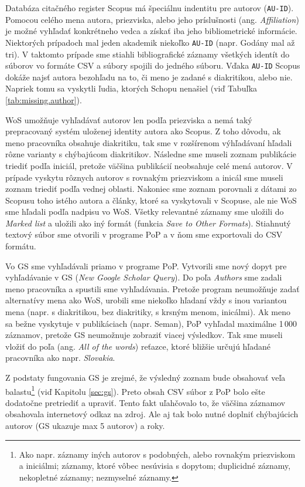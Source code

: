 Databáza citačného register Scopus má špeciálnu indentitu pre autorov
(\texttt{AU-ID}).  Pomocou celého mena autora, priezviska, alebo jeho
príslušnosti (ang.  \emph{Affiliation}) je možné vyhľadať konkrétneho vedca a
získať iba jeho bibliometrické informácie. Niektorých prípadoch mal jeden
akademik niekoľko \texttt{AU-ID} (napr. Godány mal až tri). V taktomto prípade
sme stiahli bibliografické záznamy všetkých identít do súborov vo formáte CSV a
súbory spojili do jedného súboru.  Vďaka  \texttt{AU-ID} Scopus dokáže najsť
autora bezohľadu na to, či meno je zadané s diakritikou, alebo nie.  Napriek
tomu sa vyskytli ľudia, ktorých Schopu nenašiel (viď Tabuľka
\ref{tab:missing.author}).

WoS umožňuje vyhľadávať autorov len podľa priezviska a nemá taký prepracovaný
systém uloženej identity autora ako Scopus. Z toho dôvodu, ak meno pracovníka
obsahuje diakritiku, tak sme v rozšírenom výhľadávaní hľadali rôzne varianty s
chýbajúcom diakritikov. Následne sme museli zoznam publikácie triediť podľa
iniciál, pretože väčšina publikácií neobsahuje celé mená autorov. V prípade
vyskytu rôznych autorov s rovnakým priezviskom a inicál sme museli zoznam
triediť podľa vednej oblasti. Nakoniec sme zoznam porovnali z dátami zo Scopusu
toho istého autora a články, ktoré sa vyskytovali v Scopuse, ale nie WoS sme
hľadali podľa nadpisu vo WoS. Všetky relevantné záznamy sme uložili do
\emph{Marked list} a uložili ako iný formát (funkcia \emph{Save to Other
Formats}). Stiahnutý textový súbor sme otvorili v programe PoP a v ňom sme
exportovali do CSV formátu.

Vo GS sme vyhľadávali priamo v programe PoP. Vytvorili sme nový dopyt pre
vyhľadávanie v GS (\emph{New Google Scholar Query}). Do poľa  \emph{Authors}
sme zadali meno pracovníka a spustili sme vyhľadávania. Pretože program
neumožňuje zadať alternatívy mena ako WoS, urobili sme niekoľko hľadaní vždy s
inou variantou mena (napr. s diakritikou, bez diakritiky, s krsným menom,
inicálmi).  Ak meno sa bežne vyskytuje v publikáciach (napr. Seman), PoP
vyhľadal maximálne 1\,000 záznamov, pretože GS neumožnuje zobraziť viacej
výsledkov. Tak sme museli vložiť do poľa  (ang. \emph{All of
the words}) reťazce, ktoré bližšie určujú hľadané pracovníka ako napr.
\emph{Slovakia}. 

Z podstaty fungovania GS je zrejmé, že výsledný zoznam bude obsahovať veľa
balastu\footnote{Ako napr. záznamy iných autorov s podobných, alebo rovnakým
priezviskom a iniciálmi; záznamy, ktoré vôbec nesúvisia s dopytom; duplicidné
záznamy, nekopletné záznamy; nezmyselné záznamy.} (viď Kapitolu \ref{sec:gs}).
Preto obsah CSV súbor z PoP bolo ešte dodatočne pretriediť a upraviť. Tento fakt uľahčovalo 
to, že väčšina záznamov obsahovala internetový odkaz na zdroj. Ale aj tak
bolo nutné doplniť chýbajúcich autorov (GS ukazuje max 5 autorov) a roky.

